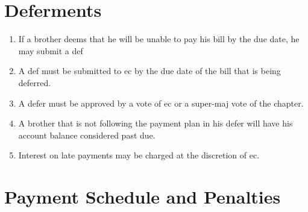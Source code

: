 \documentclass[]{article}
\begin{document}
\section{Deferments}
\label{def}
	\begin{enumerate}
		\item If a brother deems that he will be unable to pay his bill by the due date, he may submit a \gls{def}
		\item A \gls{def} must be submitted to \gls{ec} by the due date of the bill that is being deferred. 
		\item A \gls{defer} must be approved by a vote of \gls{ec} or a \gls{super-maj} vote of the chapter.
		\item A brother that is not following the payment plan in his \gls{defer} will have his account balance considered past due.
		\item Interest on late payments may be charged at the discretion of \gls{ec}.
	\end{enumerate}

\section{Payment Schedule and Penalties}
\end{document}
